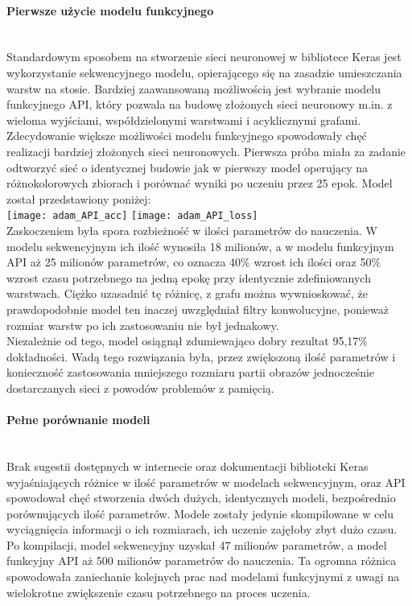 \paragraph{Pierwsze użycie modelu funkcyjnego} \mbox{}\\
Standardowym sposobem na stworzenie sieci neuronowej w bibliotece Keras jest wykorzystanie
sekwencyjnego modelu, opierającego się na zasadzie umieszczania warstw na stosie. Bardziej
zaawansowaną możliwością jest wybranie modelu funkcyjnego API, który pozwala na budowę złożonych
sieci neuronowy m.in. z wieloma wyjściami, współdzielonymi warstwami i acyklicznymi grafami.\\
Zdecydowanie większe możliwości modelu funkcyjnego spowodowały chęć realizacji bardziej złożonych
sieci neuronowych. Pierwsza próba miała za zadanie odtworzyć sieć o identycznej budowie jak w
pierwszy model operujący na różnokolorowych zbiorach i porównać wyniki po uczeniu przez 25 epok.
Model został przedstawiony poniżej:\\
\texttt{[image: adam\_API\_acc]}
\texttt{[image: adam\_API\_loss]}\\
Zaskoczeniem była spora rozbieżność w ilości parametrów do nauczenia. W modelu sekwencyjnym
ich ilość wynosiła 18 milionów, a w modelu funkcyjnym API aż 25 milionów parametrów, co oznacza
40\% wzrost ich ilości oraz 50\% wzrost czasu potrzebnego na jedną epokę przy identycznie
zdefiniowanych warstwach. Ciężko uzasadnić tę różnicę, z grafu można wywnioskować, że
prawdopodobnie model ten inaczej uwzględniał filtry konwolucyjne, ponieważ rozmiar warstw
po ich zastosowaniu nie był jednakowy.\\
Niezależnie od tego, model osiągnął zdumiewająco dobry rezultat 95,17\% dokładności.
Wadą tego rozwiązania była, przez zwiększoną ilość parametrów i konieczność zastosowania
mniejszego rozmiaru partii obrazów jednocześnie dostarczanych sieci z powodów
problemów z pamięcią.

\paragraph{Pełne porównanie modeli} \mbox{}\\
Brak sugestii dostępnych w internecie oraz dokumentacji biblioteki Keras wyjaśniających różnice
w ilość parametrów w modelach sekwencyjnym, oraz API spowodował chęć stworzenia dwóch dużych,
identycznych modeli, bezpośrednio porównujących ilość parametrów. Modele zostały jedynie
skompilowane w celu wyciągnięcia informacji o ich rozmiarach, ich uczenie zajęłoby zbyt dużo czasu.\\
Po kompilacji, model sekwencyjny uzyskał 47 milionów parametrów, a model funkcyjny API
aż 500 milionów parametrów do nauczenia. Ta ogromna różnica spowodowała zaniechanie
kolejnych prac nad modelami funkcyjnymi z uwagi na wielokrotne zwiększenie czasu potrzebnego
na proces uczenia.

